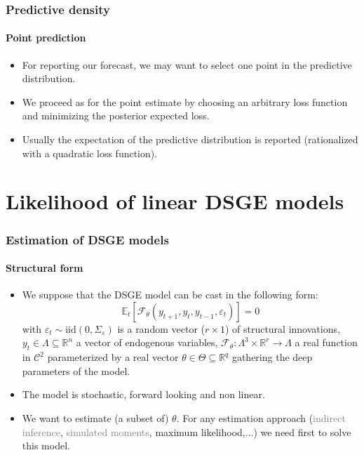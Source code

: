\documentclass[10pt,slidestop]{beamer}
\newcommand{\iid}[2]{\mathrm{iid}\left(#1,#2\right)}
\begin{document}
\begin{frame}
  \frametitle{Predictive density}
  \framesubtitle{Point prediction}
  \begin{itemize}
  \item For reporting our forecast, we may want to select one point in
    the predictive distribution.
    \bigskip
  \item We proceed as for the point estimate by choosing an arbitrary
    loss function and minimizing the posterior expected loss.
    \bigskip
  \item Usually the expectation of the predictive distribution is
    reported (rationalized with a quadratic loss function).
  \end{itemize}

\end{frame}


\section{Likelihood of linear DSGE models}


\begin{frame}
  \frametitle{Estimation of DSGE models}
  \framesubtitle{Structural form}
  \begin{itemize}
  \item We suppose that the DSGE model can be cast in the following form:
  \begin{equation}\label{equ:dsge:def}
    \mathbb E_t \left[\mathcal
      F_{\theta}(y_{t+1},y_{t},y_{t-1},\varepsilon_t)\right] = 0
  \end{equation}
  with $\varepsilon_t \sim \iid{0}{\Sigma_{\varepsilon}}$ is a random vector ($r \times 1$) of structural innovations,
  $ y_t \in \Lambda\subseteq\mathbb R^n $ a vector of endogenous variables,
  $\mathcal F_{\theta}: \Lambda^{3} \times \mathbb R^r \rightarrow \Lambda$ a
  real function in $\mathcal C^2$ parameterized by a real vector
  $\theta \in \Theta \subseteq \mathbb R^q$ gathering the deep parameters of the model.

  \bigskip

  \item The model is stochastic, forward looking and non linear.

  \bigskip

  \item We want to estimate (a subset of) $\theta$. For any estimation approach
(\textcolor{gray}{indirect inference},
   \textcolor{gray}{simulated moments}, maximum likelihood,...) we need first to solve this model.

  \end{itemize}

\end{frame}
\end{document}
